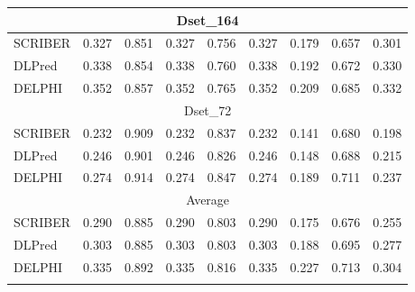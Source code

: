 \begin{table}
\begin{tabular}{|lrrrrrrrr|}
    \midrule
    \multicolumn{9}{|c|}{Dset\_164} \\
    \midrule
    SCRIBER & 0.327 & 0.851 & 0.327 & 0.756 & 0.327 & 0.179 & 0.657 & 0.301 \\
    DLPred & \cellcolor[rgb]{ .714,  .792,  .663}0.338 & \cellcolor[rgb]{ .71,  .788,  .659}0.854 & \cellcolor[rgb]{ .714,  .792,  .663}0.338 & \cellcolor[rgb]{ .714,  .788,  .659}0.760 & \cellcolor[rgb]{ .714,  .792,  .663}0.338 & \cellcolor[rgb]{ .714,  .792,  .663}0.192 & \cellcolor[rgb]{ .635,  .733,  .569}0.672 & \cellcolor[rgb]{ .365,  .537,  .251}0.330 \\
    DELPHI & \cellcolor[rgb]{ .329,  .51,  .208}0.352 & \cellcolor[rgb]{ .329,  .51,  .208}0.857 & \cellcolor[rgb]{ .329,  .51,  .208}0.352 & \cellcolor[rgb]{ .329,  .51,  .208}0.765 & \cellcolor[rgb]{ .329,  .51,  .208}0.352 & \cellcolor[rgb]{ .329,  .51,  .208}0.209 & \cellcolor[rgb]{ .329,  .51,  .208}0.685 & \cellcolor[rgb]{ .329,  .51,  .208}0.332 \\
    \midrule
    \multicolumn{9}{|c|}{Dset\_72} \\
    \midrule
    SCRIBER & 0.232 & \cellcolor[rgb]{ .612,  .718,  .541}0.909 & 0.232 & \cellcolor[rgb]{ .635,  .733,  .569}0.837 & 0.232 & 0.141 & 0.680 & 0.198 \\
    DLPred & \cellcolor[rgb]{ .776,  .839,  .737}0.246 & 0.901 & \cellcolor[rgb]{ .776,  .839,  .737}0.246 & 0.826 & \cellcolor[rgb]{ .776,  .839,  .737}0.246 & \cellcolor[rgb]{ .91,  .937,  .894}0.148 & \cellcolor[rgb]{ .82,  .867,  .784}0.688 & \cellcolor[rgb]{ .706,  .784,  .651}0.215 \\
    DELPHI & \cellcolor[rgb]{ .329,  .51,  .208}0.274 & \cellcolor[rgb]{ .329,  .51,  .208}0.914 & \cellcolor[rgb]{ .329,  .51,  .208}0.274 & \cellcolor[rgb]{ .329,  .51,  .208}0.847 & \cellcolor[rgb]{ .329,  .51,  .208}0.274 & \cellcolor[rgb]{ .329,  .51,  .208}0.189 & \cellcolor[rgb]{ .329,  .51,  .208}0.711 & \cellcolor[rgb]{ .329,  .51,  .208}0.237 \\
    \midrule
    \multicolumn{9}{|c|}{Average} \\
    \midrule
    SCRIBER & 0.290 & 0.885 & 0.290 & 0.803 & 0.290 & 0.175 & 0.676 & 0.255 \\
    DLPred & \cellcolor[rgb]{ .812,  .863,  .776}0.303 & \cellcolor[rgb]{ .992,  .992,  .988}0.885 & \cellcolor[rgb]{ .808,  .859,  .773}0.303 & \cellcolor[rgb]{ .976,  .984,  .973}0.803 & \cellcolor[rgb]{ .808,  .863,  .773}0.303 & \cellcolor[rgb]{ .835,  .882,  .804}0.188 & \cellcolor[rgb]{ .659,  .753,  .6}0.695 & \cellcolor[rgb]{ .702,  .784,  .647}0.277 \\
    DELPHI & \cellcolor[rgb]{ .329,  .51,  .208}0.335 & \cellcolor[rgb]{ .329,  .51,  .208}0.892 & \cellcolor[rgb]{ .329,  .51,  .208}0.335 & \cellcolor[rgb]{ .329,  .51,  .208}0.816 & \cellcolor[rgb]{ .329,  .51,  .208}0.335 & \cellcolor[rgb]{ .329,  .51,  .208}0.227 & \cellcolor[rgb]{ .329,  .51,  .208}0.713 & \cellcolor[rgb]{ .329,  .51,  .208}0.304 \\
    \bottomrule\label{tab_ds355_ds186_164_72}
    \end{tabular}%
\end{table}%

